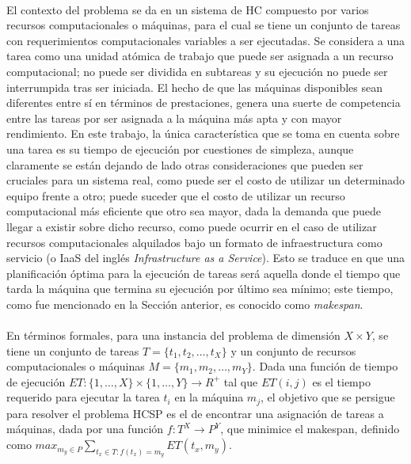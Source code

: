 \paragraph{}El contexto del problema se da en un sistema de HC compuesto por varios recursos computacionales o máquinas, para el cual se tiene un conjunto de tareas con requerimientos computacionales variables a ser ejecutadas.
Se considera a una tarea como una unidad atómica de trabajo que puede ser asignada a un recurso computacional; no puede ser dividida en subtareas y su ejecución no puede ser interrumpida tras ser iniciada.
El hecho de que las máquinas disponibles sean diferentes entre sí en términos de prestaciones, genera una suerte de competencia entre las tareas por ser asignada a la máquina más apta y con mayor rendimiento.
En este trabajo, la única característica que se toma en cuenta sobre una tarea es su tiempo de ejecución por cuestiones de simpleza, aunque claramente se están dejando de lado otras consideraciones que pueden ser cruciales para un sistema real, como puede ser el costo de utilizar un determinado equipo frente a otro; puede suceder que el costo de utilizar un recurso computacional más eficiente que otro sea mayor, dada la demanda que puede llegar a existir sobre dicho recurso, como puede ocurrir en el caso de utilizar recursos computacionales alquilados bajo un formato de infraestructura como servicio (o IaaS del inglés \textit{Infrastructure as a Service}). 
Esto se traduce en que una planificación óptima para la ejecución de tareas será aquella donde el tiempo que tarda la máquina que termina su ejecución por último sea mínimo; este tiempo, como fue mencionado en la Sección anterior, es conocido como \textit{makespan}.

\paragraph{}En términos formales, para una instancia del problema de dimensión $X\times Y$, se tiene un conjunto de tareas $T = \{t_1,t_2,\dots,t_X\}$ y un conjunto de recursos computacionales o máquinas $M = \{m_1,m_2,\dots,m_Y \}$.
Dada una función de tiempo de ejecución $ET : \{1,\dots,X\} \times \{1,\dots,Y\} \rightarrow R^+$ tal que $ET(i,j)$ es el tiempo requerido para ejecutar la tarea $t_i$ en la máquina $m_j$, el objetivo que se persigue para resolver el problema HCSP es el de encontrar una asignación de tareas a máquinas, dada por una función $f: T^X \rightarrow P^Y$, que minimice el makespan, definido como $max_{m_y \in P} \sum_{t_x \in T: f(t_x)=m_y} ET(t_x, m_y)$.

